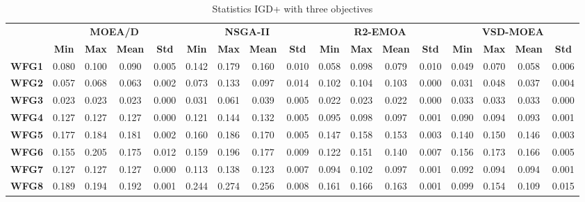 
\begin{table*}[t]
\caption{Statistics IGD+ with three objectives}
\label{tab:StatisticsIGDP_3obj}
\centering
\begin{tabular}{c c|c|c|c|c|c|c|c|c|c|c|c|c|c|c|c}
\cline{2-17}
\textbf{} & \multicolumn{4}{c|}{\textbf{MOEA/D}} & \multicolumn{4}{c|}{\textbf{NSGA-II}} & \multicolumn{4}{c|}{\textbf{R2-EMOA}} & \multicolumn{4}{c}{\textbf{VSD-MOEA}} \\ \cline{2-17} 
 & \textbf{Min} & \textbf{Max} & \textbf{Mean} & \textbf{Std} & \textbf{Min} & \textbf{Max} & \textbf{Mean} & \textbf{Std} & \textbf{Min} & \textbf{Max} & \textbf{Mean} & \textbf{Std} & \textbf{Min} & \textbf{Max} & \textbf{Mean} & \textbf{Std} \\ \hline
\multicolumn{1}{c|}{\textbf{WFG1}} & 0.080 & 0.100 & 0.090 & 0.005 & 0.142 & 0.179 & 0.160 & 0.010 & 0.058 & 0.098 & 0.079 & 0.010 & 0.049 & 0.070 & 0.058 & 0.006 \\ \hline
\multicolumn{1}{c|}{\textbf{WFG2}} & 0.057 & 0.068 & 0.063 & 0.002 & 0.073 & 0.133 & 0.097 & 0.014 & 0.102 & 0.104 & 0.103 & 0.000 & 0.031 & 0.048 & 0.037 & 0.004 \\ \hline
\multicolumn{1}{c|}{\textbf{WFG3}} & 0.023 & 0.023 & 0.023 & 0.000 & 0.031 & 0.061 & 0.039 & 0.005 & 0.022 & 0.023 & 0.022 & 0.000 & 0.033 & 0.033 & 0.033 & 0.000 \\ \hline
\multicolumn{1}{c|}{\textbf{WFG4}} & 0.127 & 0.127 & 0.127 & 0.000 & 0.121 & 0.144 & 0.132 & 0.005 & 0.095 & 0.098 & 0.097 & 0.001 & 0.090 & 0.094 & 0.093 & 0.001 \\ \hline
\multicolumn{1}{c|}{\textbf{WFG5}} & 0.177 & 0.184 & 0.181 & 0.002 & 0.160 & 0.186 & 0.170 & 0.005 & 0.147 & 0.158 & 0.153 & 0.003 & 0.140 & 0.150 & 0.146 & 0.003 \\ \hline
\multicolumn{1}{c|}{\textbf{WFG6}} & 0.155 & 0.205 & 0.175 & 0.012 & 0.159 & 0.196 & 0.177 & 0.009 & 0.122 & 0.151 & 0.140 & 0.007 & 0.156 & 0.173 & 0.166 & 0.005 \\ \hline
\multicolumn{1}{c|}{\textbf{WFG7}} & 0.127 & 0.127 & 0.127 & 0.000 & 0.113 & 0.138 & 0.123 & 0.007 & 0.094 & 0.102 & 0.097 & 0.001 & 0.092 & 0.094 & 0.094 & 0.001 \\ \hline
\multicolumn{1}{c|}{\textbf{WFG8}} & 0.189 & 0.194 & 0.192 & 0.001 & 0.244 & 0.274 & 0.256 & 0.008 & 0.161 & 0.166 & 0.163 & 0.001 & 0.099 & 0.154 & 0.109 & 0.015 \\ \hline

\end{tabular}
\end{table*}
